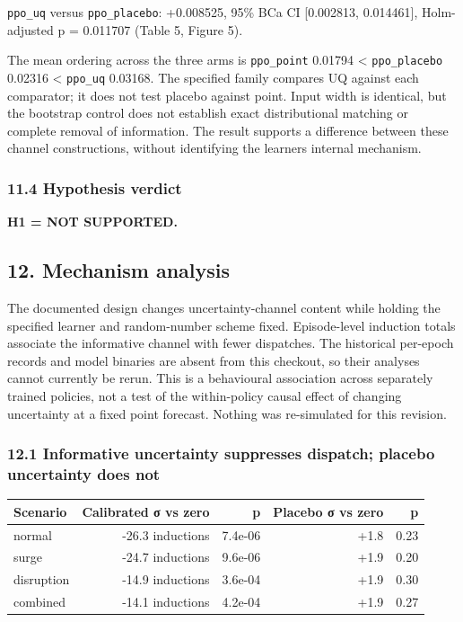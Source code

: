 \documentclass[
]{article}
\begin{document}
\texttt{ppo\_uq} versus \texttt{ppo\_placebo}: +0.008525, 95\% BCa CI
{[}0.002813, 0.014461{]}, Holm-adjusted p = 0.011707 (Table 5, Figure
5).

The mean ordering across the three arms is \texttt{ppo\_point} 0.01794
\textless{} \texttt{ppo\_placebo} 0.02316 \textless{} \texttt{ppo\_uq}
0.03168. The specified family compares UQ against each comparator; it
does not test placebo against point. Input width is identical, but the
bootstrap control does not establish exact distributional matching or
complete removal of information. The result supports a difference
between these channel constructions, without identifying the
learner\textquotesingle s internal mechanism.

\subsubsection{11.4 Hypothesis verdict}\label{114-hypothesis-verdict}

\textbf{H1 = NOT SUPPORTED.}

\subsection{12. Mechanism analysis}\label{12-mechanism-analysis}

The documented design changes uncertainty-channel content while holding
the specified learner and random-number scheme fixed. Episode-level
induction totals associate the informative channel with fewer
dispatches. The historical per-epoch records and model binaries are
absent from this checkout, so their analyses cannot currently be rerun.
This is a behavioural association across separately trained policies,
not a test of the within-policy causal effect of changing uncertainty at
a fixed point forecast. Nothing was re-simulated for this revision.

\subsubsection{12.1 Informative uncertainty suppresses dispatch; placebo
uncertainty does
not}\label{121-informative-uncertainty-suppresses-dispatch-placebo-uncertainty-does-not}

\begin{longtable}[]{@{}lrrrr@{}}
\toprule\noalign{}
Scenario & Calibrated σ vs zero & p & Placebo σ vs zero & p \\
\midrule\noalign{}
\endhead
\bottomrule\noalign{}
\endlastfoot
normal & -26.3 inductions & 7.4e-06 & +1.8 & 0.23 \\
surge & -24.7 inductions & 9.6e-06 & +1.9 & 0.20 \\
disruption & -14.9 inductions & 3.6e-04 & +1.9 & 0.30 \\
combined & -14.1 inductions & 4.2e-04 & +1.9 & 0.27 \\
\end{longtable}
\end{document}
